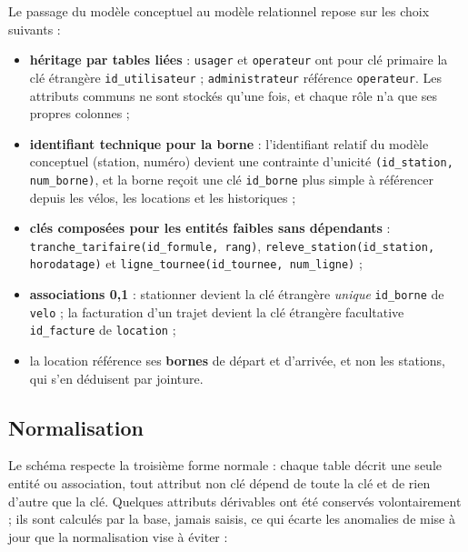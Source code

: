 Le passage du modèle conceptuel au modèle relationnel repose sur les choix suivants :
\begin{itemize}
	\item \textbf{héritage par tables liées} : \texttt{usager} et \texttt{operateur} ont pour clé primaire la clé étrangère \texttt{id\_utilisateur} ; \texttt{administrateur} référence \texttt{operateur}. Les attributs communs ne sont stockés qu'une fois, et chaque rôle n'a que ses propres colonnes ;
	\item \textbf{identifiant technique pour la borne} : l'identifiant relatif du modèle conceptuel (station, numéro) devient une contrainte d'unicité \texttt{(id\_station, num\_borne)}, et la borne reçoit une clé \texttt{id\_borne} plus simple à référencer depuis les vélos, les locations et les historiques ;
	\item \textbf{clés composées pour les entités faibles sans dépendants} : \texttt{tranche\_tarifaire(id\_formule, rang)}, \texttt{releve\_station(id\_station, horodatage)} et \texttt{ligne\_tournee(id\_tournee, num\_ligne)} ;
	\item \textbf{associations 0,1} : \og stationner \fg{} devient la clé étrangère \emph{unique} \texttt{id\_borne} de \texttt{velo} ; la facturation d'un trajet devient la clé étrangère facultative \texttt{id\_facture} de \texttt{location} ;
	\item la location référence ses \textbf{bornes} de départ et d'arrivée, et non les stations, qui s'en déduisent par jointure.
\end{itemize}

\subsection{Normalisation}

Le schéma respecte la troisième forme normale : chaque table décrit une seule entité ou association, tout attribut non clé dépend de toute la clé et de rien d'autre que la clé. Quelques attributs dérivables ont été conservés volontairement ; ils sont calculés par la base, jamais saisis, ce qui écarte les anomalies de mise à jour que la normalisation vise à éviter :

